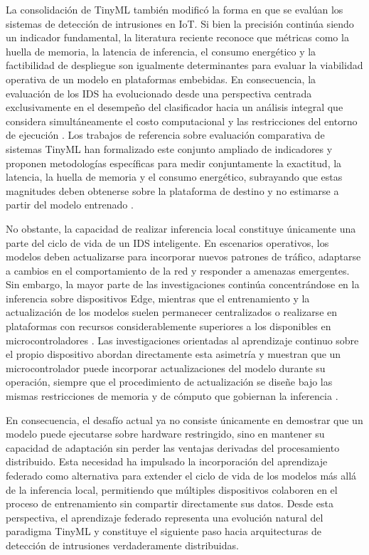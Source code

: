\documentclass[journal,article,submit,moreauthors]{Definitions/mdpi}
\begin{document}
La consolidación de TinyML también modificó la forma en que se evalúan los sistemas de detección de intrusiones en IoT. Si bien la precisión continúa siendo un indicador fundamental, la literatura reciente reconoce que métricas como la huella de memoria, la latencia de inferencia, el consumo energético y la factibilidad de despliegue son igualmente determinantes para evaluar la viabilidad operativa de un modelo en plataformas embebidas. En consecuencia, la evaluación de los IDS ha evolucionado desde una perspectiva centrada exclusivamente en el desempeño del clasificador hacia un análisis integral que considera simultáneamente el costo computacional y las restricciones del entorno de ejecución \cite{Tekin2023,Amuthadevi2025,Dini2024,Heydari2024}. Los trabajos de referencia sobre evaluación comparativa de sistemas TinyML han formalizado este conjunto ampliado de indicadores y proponen metodologías específicas para medir conjuntamente la exactitud, la latencia, la huella de memoria y el consumo energético, subrayando que estas magnitudes deben obtenerse sobre la plataforma de destino y no estimarse a partir del modelo entrenado \cite{HeydariSurvey2025,Bartoli2025,Banbury2020}.

No obstante, la capacidad de realizar inferencia local constituye únicamente una parte del ciclo de vida de un IDS inteligente. En escenarios operativos, los modelos deben actualizarse para incorporar nuevos patrones de tráfico, adaptarse a cambios en el comportamiento de la red y responder a amenazas emergentes. Sin embargo, la mayor parte de las investigaciones continúa concentrándose en la inferencia sobre dispositivos Edge, mientras que el entrenamiento y la actualización de los modelos suelen permanecer centralizados o realizarse en plataformas con recursos considerablemente superiores a los disponibles en microcontroladores \cite{Ficco2024,Ramadan2025}. Las investigaciones orientadas al aprendizaje continuo sobre el propio dispositivo abordan directamente esta asimetría y muestran que un microcontrolador puede incorporar actualizaciones del modelo durante su operación, siempre que el procedimiento de actualización se diseñe bajo las mismas restricciones de memoria y de cómputo que gobiernan la inferencia \cite{Ren2024}.

En consecuencia, el desafío actual ya no consiste únicamente en demostrar que un modelo puede ejecutarse sobre hardware restringido, sino en mantener su capacidad de adaptación sin perder las ventajas derivadas del procesamiento distribuido. Esta necesidad ha impulsado la incorporación del aprendizaje federado como alternativa para extender el ciclo de vida de los modelos más allá de la inferencia local, permitiendo que múltiples dispositivos colaboren en el proceso de entrenamiento sin compartir directamente sus datos. Desde esta perspectiva, el aprendizaje federado representa una evolución natural del paradigma TinyML y constituye el siguiente paso hacia arquitecturas de detección de intrusiones verdaderamente distribuidas.
\end{document}
